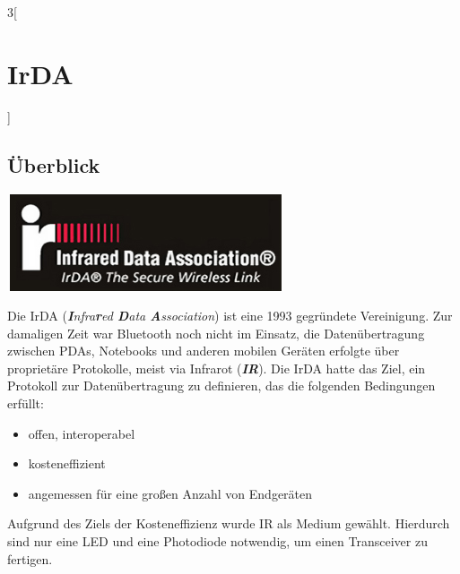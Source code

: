 \begin{multicols}{3}[\section{IrDA}]
\subsection*{Überblick}
\begin{Figure}
\includegraphics[width=\linewidth]{Kapitel/IrDA/Grafiken/logo_irda.png}
\label{fig:irda.logo}
\end{Figure}
Die IrDA (\textit{\textbf{I}nfra\textbf{r}ed \textbf{D}ata \textbf{A}ssociation}) ist eine 1993 gegründete Vereinigung.
Zur damaligen Zeit war Bluetooth noch nicht im Einsatz, die Datenübertragung zwischen PDAs, Notebooks und anderen mobilen Geräten erfolgte über proprietäre Protokolle, meist via Infrarot (\textit{\textbf{IR}}). Die IrDA hatte das Ziel, ein Protokoll zur Datenübertragung zu definieren, das die folgenden Bedingungen erfüllt:
\begin{itemize}
	\item offen, interoperabel
	\item kosteneffizient
	\item angemessen für eine großen Anzahl von Endgeräten~\cite{irdamarketing}
\end{itemize}

Aufgrund des Ziels der Kosteneffizienz wurde IR als Medium gewählt. Hierdurch sind nur eine LED und eine Photodiode notwendig, um einen Transceiver zu fertigen.~\cite{hparticle}


\end{multicols}
